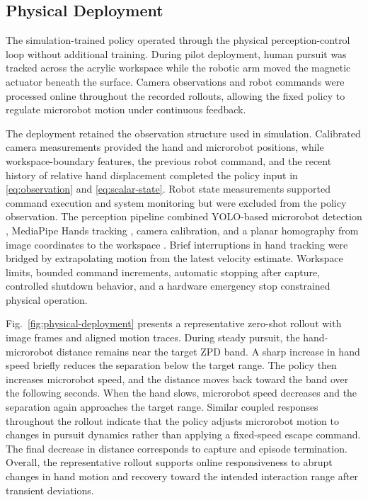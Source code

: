 \documentclass[journal,twoside,web]{ieeecolor2}
\begin{document}
\subsection{Physical Deployment}
\label{subsec:physical-deployment}
The simulation-trained policy operated through the physical perception-control loop without additional training. During pilot deployment, human pursuit was tracked across the acrylic workspace while the robotic arm moved the magnetic actuator beneath the surface. Camera observations and robot commands were processed online throughout the recorded rollouts, allowing the fixed policy to regulate microrobot motion under continuous feedback.

The deployment retained the observation structure used in simulation. Calibrated camera measurements provided the hand and microrobot positions, while workspace-boundary features, the previous robot command, and the recent history of relative hand displacement completed the policy input in \eqref{eq:observation} and \eqref{eq:scalar-state}. Robot state measurements supported command execution and system monitoring but were excluded from the policy observation. The perception pipeline combined YOLO-based microrobot detection \cite{redmonYOLO2016}, MediaPipe Hands tracking \cite{zhangMediaPipeHands2020}, camera calibration, and a planar homography from image coordinates to the workspace \cite{zhangCameraCalibration2000}. Brief interruptions in hand tracking were bridged by extrapolating motion from the latest velocity estimate. Workspace limits, bounded command increments, automatic stopping after capture, controlled shutdown behavior, and a hardware emergency stop constrained physical operation.

Fig.~\ref{fig:physical-deployment} presents a representative zero-shot rollout with image frames and aligned motion traces. During steady pursuit, the hand-microrobot distance remains near the target ZPD band. A sharp increase in hand speed briefly reduces the separation below the target range. The policy then increases microrobot speed, and the distance moves back toward the band over the following seconds. When the hand slows, microrobot speed decreases and the separation again approaches the target range. Similar coupled responses throughout the rollout indicate that the policy adjusts microrobot motion to changes in pursuit dynamics rather than applying a fixed-speed escape command. The final decrease in distance corresponds to capture and episode termination. Overall, the representative rollout supports online responsiveness to abrupt changes in hand motion and recovery toward the intended interaction range after transient deviations.
\end{document}
